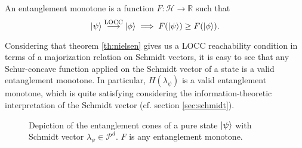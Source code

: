 \begin{definition}
    An entanglement monotone is a function $F: \mathcal{H} \rightarrow \mathbb{R}$ such that
    \begin{equation}
        \ket{\psi} \overset{\text{LOCC}}{\longrightarrow} \ket{\phi} \implies F(\ket{\psi}) \geq F(\ket{\phi}).
    \end{equation}
\end{definition}

\noindent Considering that theorem \ref{th:nielsen} gives us a LOCC reachability condition in terms of a majorization relation on Schmidt vectors, it is easy to see that any Schur-concave function applied on the Schmidt vector of a state is a valid entanglement monotone. In particular, $H(\lambda_\psi)$ is a valid entanglement monotone, which is quite satisfying considering the information-theoretic interpretation of the Schmidt vector (cf. section \ref{sec:schmidt}).

\begin{figure}[h!]
    \centering
    \caption{Depiction of the entanglement cones of a pure state $\ket{\psi}$ with Schmidt vector $\lambda_\psi \in \mathcal{P}^d$. $F$ is any entanglement monotone.}
    \label{fig:nielsen_cones_example}
\end{figure}

